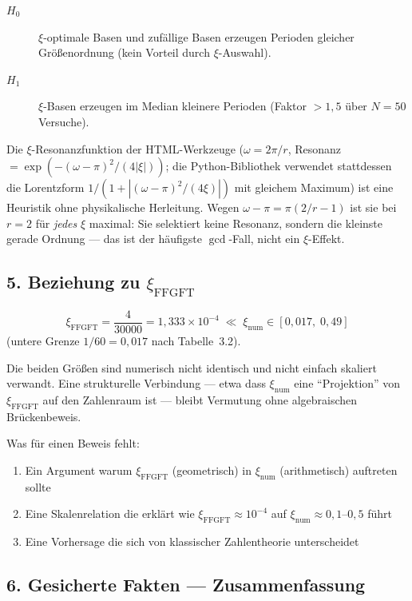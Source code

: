 \begin{description}
\item[$H_0$] $\xi$-optimale Basen und zufällige Basen erzeugen Perioden gleicher
Größenordnung (kein Vorteil durch $\xi$-Auswahl).
\item[$H_1$] $\xi$-Basen erzeugen im Median kleinere Perioden (Faktor $> 1{,}5$
über $N = 50$ Versuche).
\end{description}

\begin{mdframed}[style=warn]
Die $\xi$-Resonanzfunktion der HTML-Werkzeuge
($\omega = 2\pi/r$, Resonanz $= \exp(-(\omega - \pi)^2 / (4|\xi|))$;
die Python-Bibliothek verwendet stattdessen die Lorentzform
$1/(1 + |(\omega-\pi)^2/(4\xi)|)$ mit gleichem Maximum)
ist eine Heuristik ohne physikalische Herleitung. Wegen
$\omega - \pi = \pi(2/r - 1)$ ist sie bei $r = 2$ für \emph{jedes} $\xi$
maximal: Sie selektiert keine Resonanz, sondern die kleinste gerade
Ordnung — das ist der häufigste $\gcd$-Fall, nicht ein $\xi$-Effekt.
\end{mdframed}

\subsection*{5. Beziehung zu $\xi_\text{FFGFT}$}

\[
\xi_\text{FFGFT} = \frac{4}{30000} = 1{,}333 \times 10^{-4}
\;\ll\; \xi_\text{num} \in [0{,}017,\; 0{,}49]
\]
(untere Grenze $1/60 = 0{,}017$ nach Tabelle~3.2).

Die beiden Größen sind numerisch nicht identisch und nicht einfach skaliert
verwandt. Eine strukturelle Verbindung — etwa dass $\xi_\text{num}$ eine
``Projektion'' von $\xi_\text{FFGFT}$ auf den Zahlenraum ist — bleibt Vermutung
ohne algebraischen Brückenbeweis.

Was für einen Beweis fehlt:
\begin{enumerate}
\item Ein Argument warum $\xi_\text{FFGFT}$ (geometrisch) in $\xi_\text{num}$
(arithmetisch) auftreten sollte
\item Eine Skalenrelation die erklärt wie $\xi_\text{FFGFT} \approx 10^{-4}$
auf $\xi_\text{num} \approx 0{,}1\text{--}0{,}5$ führt
\item Eine Vorhersage die sich von klassischer Zahlentheorie unterscheidet
\end{enumerate}

\subsection*{6. Gesicherte Fakten — Zusammenfassung}


